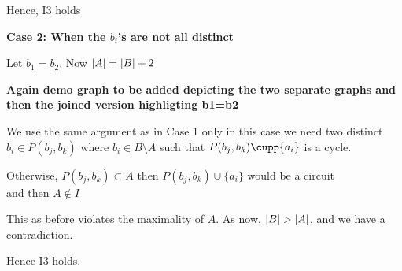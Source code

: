 \documentclass{article}
\theoremstyle{plain}
\theoremstyle{definition}
\theoremstyle{remark}
\begin{document}
 \vspace{3mm}
 
\noindent Hence, I3 holds

\noindent\textbf{Case 2: When the $b_i$'s are not all distinct}

Let $ b_1 = b_2 $. Now $ \abs{A} = \abs{B} + 2 $

\textbf{Again demo graph to be added depicting the two separate graphs and then the joined version highligting b1=b2}

\noindent We use the same argument as in Case 1 only in this case we need two distinct $ b_i \in P( b_j, b_k) $ where $ b_i \in B \setminus A $ such that  $ P(b_j , b_k ) \cupp \{ a_i \} $ is a cycle.

\vspace{2mm}

\noindent Otherwise, $ P(b_j,b_k) \subset A  $ then $ P(b_j,b_k) \cup \{ a_i \} $  would be a circuit\\ and then $ A \notin I $

\noindent This as before violates the maximality of $ A $. As now, $ \abs{B} > \abs{A} $, and we have a contradiction.

\noindent Hence I3 holds.

 
 
\end{document}
